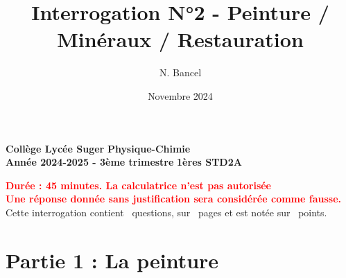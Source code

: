 \documentclass[answers]{exam}
\title{Interrogation N°2 - Peinture / Minéraux / Restauration}
\author{N. Bancel}
\date{Novembre 2024}
\begin{document}
\textbf{Collège Lycée Suger}
\hfill
\textbf{Physique-Chimie} \\

\textbf{Année 2024-2025 - 3ème trimestre}
\hfill
\textbf{1ères STD2A} \par

{\let\newpage\relax\maketitle}

\begin{center}
\textbf{\textcolor{red}{Durée : 45 minutes. La calculatrice n'est pas autorisée}} \\
\textbf{\textcolor{red}{Une réponse donnée sans justification sera considérée comme fausse.}} \\
Cette interrogation contient \numquestions\ questions, sur \numpages\ pages et est notée sur \numpoints\ points. 
\end{center}

\section{Partie 1 : La peinture}
\end{document}
